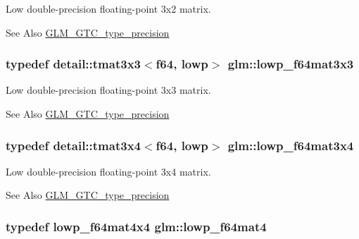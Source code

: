 Low double-\/precision floating-\/point 3x2 matrix. \begin{DoxySeeAlso}{See Also}
\hyperlink{group__gtc__type__precision}{G\-L\-M\-\_\-\-G\-T\-C\-\_\-type\-\_\-precision} 
\end{DoxySeeAlso}
\hypertarget{group__gtc__type__precision_ga3b636bef3048da2f7935eae13e66f7b3}{
\subsubsection[{lowp\-\_\-f64mat3x3}]{\setlength{\rightskip}{0pt plus 5cm}typedef detail\-::tmat3x3$<$f64, lowp$>$ {\bf glm\-::lowp\-\_\-f64mat3x3}}}\label{group__gtc__type__precision_ga3b636bef3048da2f7935eae13e66f7b3}
Low double-\/precision floating-\/point 3x3 matrix. \begin{DoxySeeAlso}{See Also}
\hyperlink{group__gtc__type__precision}{G\-L\-M\-\_\-\-G\-T\-C\-\_\-type\-\_\-precision} 
\end{DoxySeeAlso}
\hypertarget{group__gtc__type__precision_ga988c6645dead17a842c47ec042b5369e}{
\subsubsection[{lowp\-\_\-f64mat3x4}]{\setlength{\rightskip}{0pt plus 5cm}typedef detail\-::tmat3x4$<$f64, lowp$>$ {\bf glm\-::lowp\-\_\-f64mat3x4}}}\label{group__gtc__type__precision_ga988c6645dead17a842c47ec042b5369e}
Low double-\/precision floating-\/point 3x4 matrix. \begin{DoxySeeAlso}{See Also}
\hyperlink{group__gtc__type__precision}{G\-L\-M\-\_\-\-G\-T\-C\-\_\-type\-\_\-precision} 
\end{DoxySeeAlso}
\hypertarget{group__gtc__type__precision_ga4378d9384f1b24848043ccb02dcf2959}{
\subsubsection[{lowp\-\_\-f64mat4}]{\setlength{\rightskip}{0pt plus 5cm}typedef lowp\-\_\-f64mat4x4 {\bf glm\-::lowp\-\_\-f64mat4}}}\label{group__gtc__type__precision_ga4378d9384f1b24848043ccb02dcf2959}
